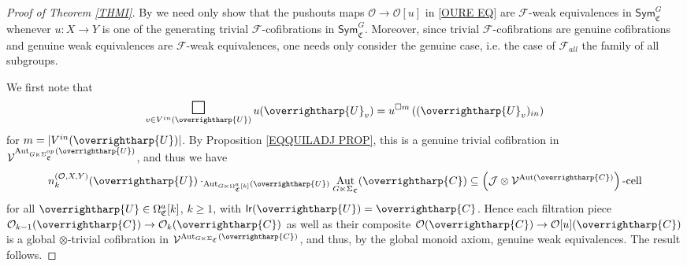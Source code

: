 \documentclass[a4paper,10pt
,draft
]{article}%
\numberwithin{equation}{section}
\numberwithin{figure}{section}
\theoremstyle{definition} %
\newcommand{\vect}[1]{\text{\overrightharp{\ensuremath{#1}}}}
\DeclareMathOperator{\Aut}{Aut}%
\newcommand{\F}{\ensuremath{\mathcal F}}
\newcommand{\V}{\ensuremath{\mathcal V}}
\renewcommand{\O}{\ensuremath{\mathcal O}}
\newcommand{\1}{\ensuremath{\mathbbm 1}}%
\begin{document}
\begin{proof}[Proof of Theorem \ref{THMI}]     
By \cite[Thm. 11.3.2]{Hir03} we need only show that
the pushouts maps $\O \to \O[u]$ in \eqref{OURE EQ}
are $\F$-weak equivalences in $\mathsf{Sym}^G_{\mathfrak{C}}$
whenever 
$u \colon X \to Y$
is one of the generating trivial $\F$-cofibrations in 
$\mathsf{Sym}^G_{\mathfrak{C}}$.
Moreover, since trivial $\F$-cofibrations are genuine cofibrations and 
genuine weak equivalences are $\F$-weak equivalences, one needs only consider the genuine case, i.e. the case of $\F_{all}$ the family of all subgroups.

We first note that
\[
      \mathop{\mathlarger{\mathlarger{\mathlarger{\square}}}}\limits_{v \in V^{in}(\vect{U})} u(\vect{U}_v)
      =
      u^{\square m}\left( (\vect U_v)_{in} \right)
\]
for $m = |V^{in}(\vect U)|$.
By Proposition \ref{EQQUILADJ PROP}, this is a genuine trivial cofibration in $\V^{\Aut_{G \ltimes \Sigma_{\mathfrak C}^{op}}(\vect U)}$,
and thus we have 
\[
      n_k^{(\O,X,Y)}(\vect U) \cdot_{\Aut_{G \ltimes \Omega^a_{\mathfrak C}[k]}(\vect U)}\Aut_{G \ltimes \Sigma_{\mathfrak C}}(\vect C)
      \subseteq
      \left( \mathcal J \otimes \V^{\Aut(\vect C)}\right)\text{-cell}
\]
for all $\vect U \in \Omega^a_{\mathfrak C}[k]$, $k \geq 1$, with $\mathsf{lr}(\vect U) = \vect C$.
Hence each filtration piece $\O_{k-1}(\vect C) \to \O_k(\vect C)$ as well as their composite
$\O(\vect C) \to \O[u](\vect C)$
is a global $\otimes$-trivial cofibration in $\V^{\Aut_{G \ltimes \Sigma_{\mathfrak C}}(\vect C)}$, 
and thus, by the global monoid axiom, genuine weak equivalences.
The result follows.


\end{proof}
\end{document}
